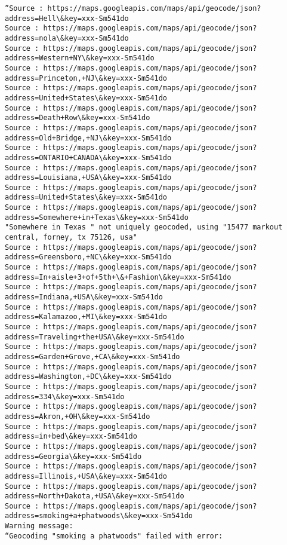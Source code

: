\documentclass[11pt]{article}
\begin{document}
\begin{Verbatim}[commandchars=\\\{\}]
”Source : https://maps.googleapis.com/maps/api/geocode/json?address=Hell\&key=xxx-Sm541do
Source : https://maps.googleapis.com/maps/api/geocode/json?address=nola\&key=xxx-Sm541do
Source : https://maps.googleapis.com/maps/api/geocode/json?address=Western+NY\&key=xxx-Sm541do
Source : https://maps.googleapis.com/maps/api/geocode/json?address=Princeton,+NJ\&key=xxx-Sm541do
Source : https://maps.googleapis.com/maps/api/geocode/json?address=United+States\&key=xxx-Sm541do
Source : https://maps.googleapis.com/maps/api/geocode/json?address=Death+Row\&key=xxx-Sm541do
Source : https://maps.googleapis.com/maps/api/geocode/json?address=Old+Bridge,+NJ\&key=xxx-Sm541do
Source : https://maps.googleapis.com/maps/api/geocode/json?address=ONTARIO+CANADA\&key=xxx-Sm541do
Source : https://maps.googleapis.com/maps/api/geocode/json?address=Louisiana,+USA\&key=xxx-Sm541do
Source : https://maps.googleapis.com/maps/api/geocode/json?address=United+States\&key=xxx-Sm541do
Source : https://maps.googleapis.com/maps/api/geocode/json?address=Somewhere+in+Texas\&key=xxx-Sm541do
"Somewhere in Texas " not uniquely geocoded, using "15477 markout central, forney, tx 75126, usa"
Source : https://maps.googleapis.com/maps/api/geocode/json?address=Greensboro,+NC\&key=xxx-Sm541do
Source : https://maps.googleapis.com/maps/api/geocode/json?address=In+aisle+3+of+5th+\&+Fashion\&key=xxx-Sm541do
Source : https://maps.googleapis.com/maps/api/geocode/json?address=Indiana,+USA\&key=xxx-Sm541do
Source : https://maps.googleapis.com/maps/api/geocode/json?address=Kalamazoo,+MI\&key=xxx-Sm541do
Source : https://maps.googleapis.com/maps/api/geocode/json?address=Traveling+the+USA\&key=xxx-Sm541do
Source : https://maps.googleapis.com/maps/api/geocode/json?address=Garden+Grove,+CA\&key=xxx-Sm541do
Source : https://maps.googleapis.com/maps/api/geocode/json?address=Washington,+DC\&key=xxx-Sm541do
Source : https://maps.googleapis.com/maps/api/geocode/json?address=334\&key=xxx-Sm541do
Source : https://maps.googleapis.com/maps/api/geocode/json?address=Akron,+OH\&key=xxx-Sm541do
Source : https://maps.googleapis.com/maps/api/geocode/json?address=in+bed\&key=xxx-Sm541do
Source : https://maps.googleapis.com/maps/api/geocode/json?address=Georgia\&key=xxx-Sm541do
Source : https://maps.googleapis.com/maps/api/geocode/json?address=Illinois,+USA\&key=xxx-Sm541do
Source : https://maps.googleapis.com/maps/api/geocode/json?address=North+Dakota,+USA\&key=xxx-Sm541do
Source : https://maps.googleapis.com/maps/api/geocode/json?address=smoking+a+phatwoods\&key=xxx-Sm541do
Warning message:
“Geocoding "smoking a phatwoods" failed with error:


\end{Verbatim}
\end{document}
